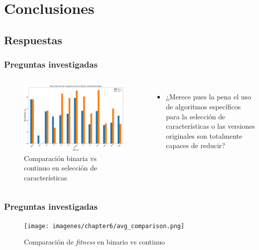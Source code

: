 \section{Conclusiones}
\subsection{Respuestas}

\begin{frame}
    \frametitle{Preguntas investigadas}
    \begin{columns}
        \begin{figure}
            \begin{center}
                \includegraphics[width=1\textwidth]{imagenes/chapter6/selected_rate_comparison.png}
            \end{center}
            \caption{Comparación binaria vs continuo en selección de características}
        \end{figure}
        \begin{itemize}
            \item ¿Merece pues la pena el uso de algoritmos específicos para la selección de características o las versiones originales son totalmente capaces de reducir?
        \end{itemize}
    \end{columns}
\end{frame}

\begin{frame}
    \frametitle{Preguntas investigadas}
    \begin{figure}
        \begin{center}
            \texttt{[image: imagenes/chapter6/avg\_comparison.png]}
        \end{center}
        \caption{Comparación de \textit{fitness} en binario vs continuo}
    \end{figure}
\end{frame}

